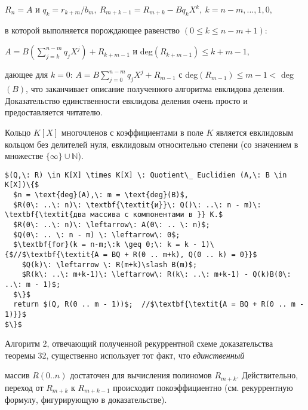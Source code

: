 \begin{center}
\noindent$R_n = A$ и $q_k = r_{k+m}\slash b_m,\: R_{m+k-1}=R_{m+k} - Bq_kX^k,\: k = n-m,...,1,0,$
\end{center}

\noindent в которой выполняется порождающее равенство $(0 \leqslant k \leqslant n - m + 1)$: 

\begin{center}
$A = B\left(\sum\limits_{j=k}^{n-m}q_jX^j\right)+R_{k+m-1}$ и deg$(R_{k+m-1})\leqslant k+m-1,$
\end{center}

\noindent дающее для $k = 0$: $A =B\sum_{j=0}^{n-m}q_jX^j + R_{m-1}$ с deg$(R_{m-1}) \leqslant m - 1 <$ 
deg$(B)$, что заканчивает описание полученного алгоритма евклидова 
деления. Доказательство единственности евклидова деления очень  
просто и предоставляется читателю. 

\begin{sled}
\hspace*{15pt}Кольцо $K[X]$ многочленов с коэффициентами в поле $K$ является  
евклидовым кольцом без делителей нуля, евклидовым относительно  
степени (со значением в множестве $\{\infty\}\cup \mathbb{N}$).\newline
\end{sled}

\begin{lstlisting}[mathescape=true, caption=Евклидово деление многочленов над полем]
$(Q,\: R) \in K[X] \times K[X] \: Quotient\_ Euclidien (A,\: B \in K[X])\{$
  $n = \text{deg}(A),\: m = \text{deg}(B)$,
  $R(0\: ..\: n)\: \textbf{\textit{и}}\: Q()\: ..\: n - m)\: \textbf{\textit{два массива с компонентами в }} K.$
  $R(0\: ..\: n)\: \leftarrow\: A(0\: .. \: n)$;
  $Q(0\: .. \: n - m) \: \leftarrow\: 0$;
  $\textbf{for}(k = n-m;\:k \geq 0;\: k = k - 1)\{$//$\textbf{\textit{A = BQ + R(0 .. m+k), Q(0 .. k) = 0}}$
    $Q(k)\: \leftarrow \: R(m+k)\slash B(m)$;
    $R(k\: ..\: m+k-1)\: \leftarrow\: R(k\: ..\: m+k-1) - Q(k)B(0\: ..\: m - 1)$;
  $\}$
  return $(Q, R(0 .. m - 1))$;  //$\textbf{\textit{A = BQ + R(0 .. m - 1)}}$
$\}$
\end{lstlisting}

Алгоритм 2, отвечающий полученной рекуррентной схеме  
доказательства теоремы 32, существенно использует тот факт, что \textit{единственный}
\pagebreak

\noindent массив $R(0 .. n)$ достаточен для вычисления полиномов $R_{m+k}$. 
Действительно, переход от $R_{m+k}$ к $R_{m+k-1}$ происходит покоэффициентно
 (см. рекуррентную формулу, фигурирующую в доказательстве).
 
